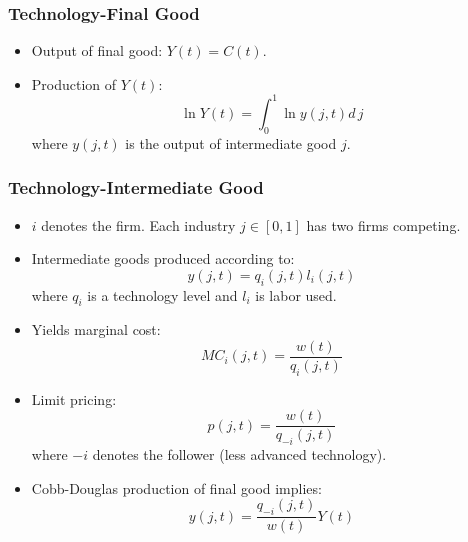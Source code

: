 \documentclass{beamer}
\begin{document}
\begin{frame}[t]\frametitle{Technology-Final Good} 
  \begin{itemize}
    \item<+-> Output of final good: $Y(t) = C(t)$.
    
    \item<+-> Production of $Y(t)$:
      \begin{equation*} \label{eq:tech_output}
        \ln Y(t) = \int_{0}^{1} \ln y(j, t) d\,j 
      \end{equation*}
      where $y(j, t)$ is the output of intermediate good $j$.
    
  \end{itemize}
\end{frame}

\begin{frame}[t]\frametitle{Technology-Intermediate Good} 
  \begin{itemize}
    \item<+-> $i$ denotes the firm.  Each industry $j \in [0, 1]$ has two firms competing.

    \item<+-> Intermediate goods produced according to:
      \begin{equation*} \label{eq:intermediate_production}
        y(j, t) = q_i(j, t)l_i(j, t)
      \end{equation*}
      where $q_i$ is a technology level and $l_i$ is labor used. 

    \item<+-> Yields marginal cost:
      \begin{equation*} \label{eq:marginal_cost}
        MC_i(j, t) = \frac{w(t)}{q_i(j, t)}
      \end{equation*}

    \item<+-> Limit pricing:
      \begin{equation*} \label{eq:limit_pricing}
        p(j, t) = \frac{w(t)}{q_{-i}(j, t)}      
      \end{equation*}
    where $-i$ denotes the follower (less advanced technology).
    \item<+-> Cobb-Douglas production of final good implies:
      \begin{equation*}
        y(j, t) = \frac{q_{-i}(j, t)}{w(t)}Y(t)
      \end{equation*}
  \end{itemize}
\end{frame}
\end{document}
